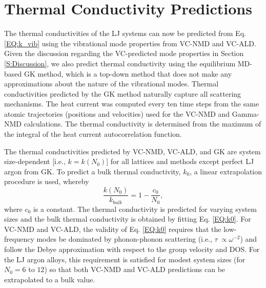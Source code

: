 \documentclass[aps,prb,onecolumn,preprint,footinbib,superscriptaddress,amsmath,amssymb,floatfix]{revtex4}
\begin{document}

\section{\label{S:Thermal Conductivity}Thermal Conductivity Predictions}

The thermal conductivities of the LJ systems can now be predicted from 
Eq. \eqref{EQ:k_vib} using the vibrational mode properties 
from VC-NMD and VC-ALD. Given the discussion regarding the 
VC-predicted mode properties in Section \ref{S:Discussion}, 
we also predict thermal conductivity using the equilibrium 
MD-based GK method, which is a top-down method that does not make any 
approximations about the nature of the vibrational modes. 
Thermal conductivities predicted by the GK method 
naturally capture all scattering mechanisms.
\cite{skye_thermal_2008,landry_complex_2008,landry_effect_2009} 
The heat current was computed every ten time steps from the same atomic 
trajectories (positions and velocities) used for the VC-NMD and 
Gamma-NMD calculations.  The thermal conductivity is 
determined from the maximum of the integral of the heat 
current autocorrelation function.

The thermal conductivities predicted by VC-NMD, VC-ALD, and GK are system 
size-dependent [i.e., $k = k(N_0)$] for all lattices and methods except 
perfect LJ argon from GK.\cite{mcgaughey_phonon_2004} 
To predict a bulk thermal conductivity, $k_0$,  
a linear extrapolation procedure is 
used, whereby 
\begin{equation}\label{EQ:k0}
\frac{k(N_0)}{k_{bulk}} = 1 - \frac{c_0}{N_0},
\end{equation}
where $c_0$ is a constant.\cite{shiomi_thermal_2011} The thermal conductivity 
is predicted for varying system sizes and the bulk thermal conductivity is 
obtained by fitting Eq. \eqref{EQ:k0}. 
For VC-NMD and VC-ALD, the validity of Eq. \eqref{EQ:k0}  
requires that the low-frequency modes be dominated by 
phonon-phonon scattering (i.e., $\tau\ \propto \omega^{-2}$) and  
follow the Debye approximation 
with respect to the group velocity and DOS.
\cite{shiomi_thermal_2011,esfarjani_heat_2011} For the LJ 
argon alloys, this requirement is satisfied for modest system sizes 
(for $N_0 = 6$ to $12$) so that both VC-NMD and VC-ALD predictions 
can be extrapolated to a bulk value. 
\end{document}
